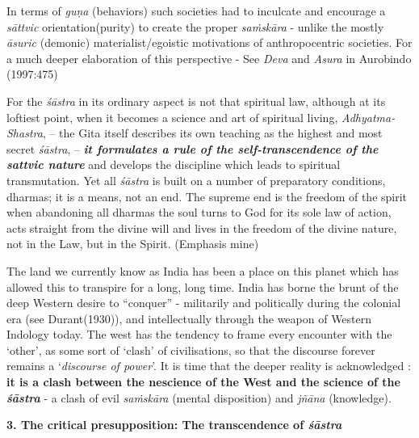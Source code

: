 In terms of {\sl guṇa} (behaviors) such societies had to inculcate and encourage a {\sl sāttvic} orientation(purity) to create the proper {\sl saṁskāra} - unlike the mostly {\sl āsuric} (demonic) materialist/egoistic motivations of anthropocentric societies. For a much deeper elaboration of this perspective - See {\sl Deva} and {\sl Asura} in Aurobindo (1997:475)
\begin{myquote}
For the {\sl śāstra} in its ordinary aspect is not that spiritual law, although at its loftiest point, when it becomes a science and art of spiritual living, {\sl Adhyatma-Shastra}, -- the Gita itself describes its own teaching as the highest and most secret {\sl śāstra}, -- {{\sl\bfseries it formulates a rule of the self-transcendence of the sattvic nature}\relax} and develops the discipline which leads to spiritual transmutation. Yet all {\sl śāstra} is built on a number of preparatory conditions, dharmas; it is a means, not an end. The supreme end is the freedom of the spirit when abandoning all dharmas the soul turns to God for its sole law of action, acts straight from the divine will and lives in the freedom of the divine nature, not in the Law, but in the Spirit. (Emphasis mine)
\end{myquote}

The land we currently know as India has been a place on this planet which has allowed this to transpire for a long, long time. India has borne the brunt of the deep Western desire to ``conquer'' - militarily and politically during the colonial era (see Durant(1930)), and intellectually through the weapon of Western Indology today. The west has the tendency to frame every encounter with the `other', as some sort of `clash' of civilisations, so that the discourse forever remains a `{\sl discourse of power}'. It is time that the deeper reality is acknowledged : {\bf it is a clash between the nescience of the West and the science of the} {{\sl\bfseries śāstra}\relax} - a clash of evil {\sl saṁskāra} (mental disposition) and {\sl jñāna} (knowledge).


\noindent
{\bf 3. The critical presupposition: The transcendence of {{\sl\bfseries śāstra}\relax}}

